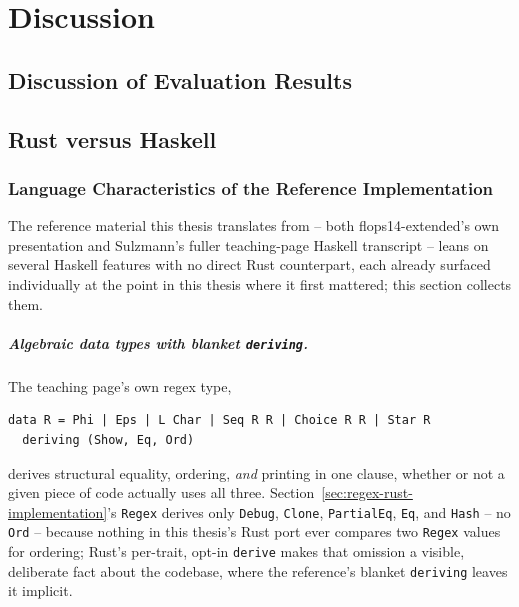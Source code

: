 \chapter{Discussion}
\label{sec:discussion}

\section{Discussion of Evaluation Results}
\label{sec:results-discussion}


\section{Rust versus Haskell}
\label{sec:rust-vs-haskell}

\subsection{Language Characteristics of the Reference Implementation}
\label{sec:haskell-language-characteristics}

The reference material this thesis translates from -- both
flops14-extended's own presentation \citep{sulzmannlu2014} and
Sulzmann's fuller teaching-page Haskell transcript \citep{sulzmann_slides}
-- leans on several Haskell features with no direct Rust counterpart,
each already surfaced individually at the point in this thesis where it
first mattered; this section collects them.

\paragraph{Algebraic data types with blanket \texttt{deriving}.} The
teaching page's own regex type,
\begin{verbatim}
data R = Phi | Eps | L Char | Seq R R | Choice R R | Star R
  deriving (Show, Eq, Ord)
\end{verbatim}
derives structural equality, ordering, \emph{and} printing in one clause,
whether or not a given piece of code actually uses all three. Section~\ref{sec:regex-rust-implementation}'s
\texttt{Regex} derives only \texttt{Debug}, \texttt{Clone},
\texttt{PartialEq}, \texttt{Eq}, and \texttt{Hash} -- no \texttt{Ord} --
because nothing in this thesis's Rust port ever compares two
\texttt{Regex} values for ordering; Rust's per-trait, opt-in
\texttt{derive} makes that omission a visible, deliberate fact about the
codebase, where the reference's blanket \texttt{deriving} leaves it
implicit.

